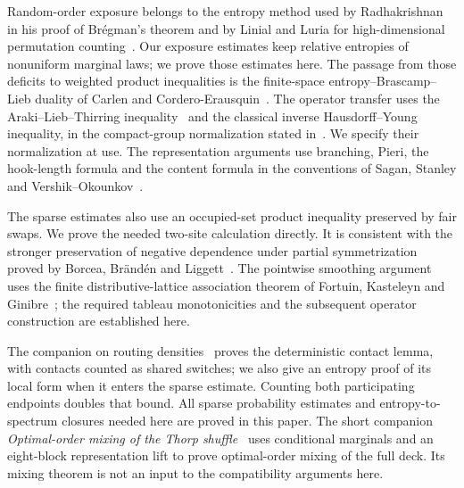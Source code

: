 Random-order exposure belongs to the entropy method used by Radhakrishnan in his proof of Br\'egman's theorem and by Linial and Luria for high-dimensional permutation counting~\cite{Radhakrishnan1997,LinialLuria2014}. Our exposure estimates keep relative entropies of nonuniform marginal laws; we prove those estimates here. The passage from those deficits to weighted product inequalities is the finite-space entropy--Brascamp--Lieb duality of Carlen and Cordero-Erausquin~\cite[Theorem~2.1]{CarlenCorderoErausquin2009}. The operator transfer uses the Araki--Lieb--Thirring inequality~\cite{araki1990,audenaert2007} and the classical inverse Hausdorff--Young inequality, in the compact-group normalization stated in~\cite[Lemma~5.1(2)]{garcia-cuerva-parcet2004}. We specify their normalization at use. The representation arguments use branching, Pieri, the hook-length formula and the content formula in the conventions of Sagan, Stanley and Vershik--Okounkov~\cite{Sagan2001,Stanley1999,VershikOkounkov2005}.

The sparse estimates also use an occupied-set product inequality preserved by fair swaps. We prove the needed two-site calculation directly. It is consistent with the stronger preservation of negative dependence under partial symmetrization proved by Borcea, Br\"and\'en and Liggett~\cite[Theorems~4.9 and~4.20]{BorceaBrandenLiggett2009}. The pointwise smoothing argument uses the finite distributive-lattice association theorem of Fortuin, Kasteleyn and Ginibre~\cite[Proposition~1]{FortuinKasteleynGinibre1971}; the required tableau monotonicities and the subsequent operator construction are established here.

The companion on routing densities~\cite[Lemma~3.2]{OpenAIRouting2026} proves the deterministic contact lemma, with contacts counted as shared switches; we also give an entropy proof of its local form when it enters the sparse estimate. Counting both participating endpoints doubles that bound. All sparse probability estimates and entropy-to-spectrum closures needed here are proved in this paper. The short companion \emph{Optimal-order mixing of the Thorp shuffle}~\cite[Theorem~1.1]{OpenAIOptimal2026} uses conditional marginals and an eight-block representation lift to prove optimal-order mixing of the full deck. Its mixing theorem is not an input to the compatibility arguments here.

